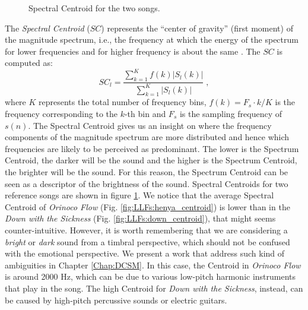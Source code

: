 \begin{figure}[t]
        \centering       
           \hfil
          \caption{Spectral Centroid for the two songs.}
          \label{fig:LLFs:centroid}          
\end{figure}

The \textit{Spectral Centroid} ($SC$) represents the ``center of gravity'' (first moment) of the magnitude spectrum, i.e., the frequency at which the energy of the spectrum for lower frequencies and for higher frequency is about the same \cite{Li2000}. The $SC$ is computed as:
\begin{equation}\label{eq:FSC}
SC_l = \frac{\sum\limits_{k=1}^{K}f(k)|S_l(k)|}{\sum\limits_{k=1}^{K}|S_l(k)|} \; ,
\end{equation}
where $K$ represents the total number of frequency bins, $f(k)=F_s \cdot k/K $ is the frequency corresponding to the $k$-th bin and $F_s$ is the sampling frequency of $s(n)$. The Spectral Centroid gives us an insight on where the frequency components of the magnitude spectrum are more distributed and hence which frequencies are likely to be perceived as predominant. The lower is the Spectrum Centroid, the darker will be the sound and the higher is the Spectrum Centroid, the brighter will be the sound. For this reason, the Spectrum Centroid can be seen as a descriptor of the brightness of the sound. Spectral Centroids for two reference songs are shown in figure \ref{fig:LLFs:centroid}. We notice that the average Spectral Centroid of \textit{Orinoco Flow} (Fig. \ref{fig:LLFs:henya_centroid}) is lower than in the \textit{Down with the Sickness} (Fig. \ref{fig:LLFs:down_centroid}), that might seems counter-intuitive. However, it is worth remembering that we are considering a \textit{bright} or \textit{dark} sound from a timbral perspective, which should not be confused with the emotional perspective. We present a work that address such kind of ambiguities in Chapter \ref{Chap:DCSM}. In this case, the Centroid in  \textit{Orinoco Flow} is around 2000 Hz, which can be due to various low-pitch harmonic instruments that play in the song. The high Centroid for \textit{Down with the Sickness}, instead, can be caused by high-pitch percussive sounds or electric guitars.

